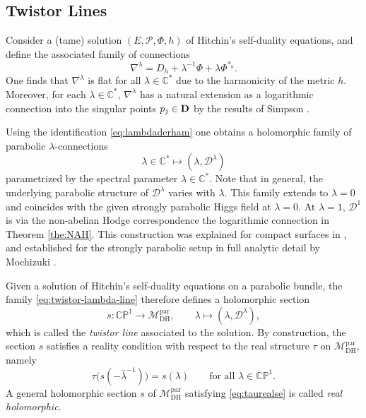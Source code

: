 \documentclass[12pt,a4paper]{amsart}
\theoremstyle{definition}
\theoremstyle{remark}
\newcommand{\C}{\mathbb C}
\newcommand{\CP}{\mathbb{CP}}
\newcommand{\Mcal}{\mathcal M}
\newcommand{\Pcal}{\mathcal P}
\newcommand{\Dcal}{\mathcal D}
\begin{document}
\subsection{Twistor Lines}
Consider a (tame) solution  $(E,\Pcal,\Phi,h)$ of Hitchin's self-duality equations, and define the
associated family of  connections
 \begin{equation}\label{eq:assocfam}
 \nabla^\lambda = D_h +\lambda^{-1} \Phi + \lambda\Phi^{*_h}.\end{equation}
 One finds that $ \nabla^\lambda$ is flat for all $\lambda\in\C^*$ due to the harmonicity of the metric $h$.
 Moreover, for each $\lambda\in\C^*$, $ \nabla^\lambda $ has a natural extension as 
 a logarithmic connection into the singular points $p_j\in{\bf D}$ by the results of Simpson \cite{Sim2}. 



 
 Using the identification \eqref{eq:lambdaderham}
 one obtains a holomorphic family of parabolic
$\lambda$-connections
\begin{equation}\label{eq:twistor-lambda-line}
\lambda\in\C^* \mapsto (\lambda,\mathcal D^\lambda)
\end{equation}
parametrized by the spectral parameter $\lambda\in\C^*.$
Note that in general, the underlying parabolic structure of $\Dcal^\lambda$ varies with $\lambda$.
This family extends to $\lambda=0$ and coincides with the given strongly parabolic Higgs field at $\lambda=0$. At $\lambda=1$,  $\mathcal D^1$ is via the non-abelian Hodge correspondence the logarithmic connection in Theorem \ref{the:NAH}.
This construction was explained for compact surfaces in \cite{Sim3}, and 
 established for the strongly parabolic setup in full analytic
detail by Mochizuki 
\cite{Mochizuki2006,Mo}.
 
Given
a solution of Hitchin's
self-duality equations on a parabolic bundle,
the
family \eqref{eq:twistor-lambda-line} therefore defines a holomorphic section
\[
s\colon \CP^1 \longrightarrow \Mcal_{\mathrm{DH}}^{\mathrm{par}},\qquad
\lambda \longmapsto(\lambda,\Dcal^\lambda),
\]
which is called the \emph{twistor line} associated to the solution.
By construction, the section $s$ satisfies a reality condition with respect to the
real structure $\tau$ on $\Mcal_{\mathrm{DH}}^{\mathrm{par}}$, namely
\begin{equation}\label{eq:taurealse}
\tau\bigl(s(-\bar{\lambda}^{-1})\bigr)=s(\lambda)
\qquad\text{for all }\lambda\in\CP^1.
\end{equation}
A general holomorphic section $s$  of
$\Mcal_{\mathrm{DH}}^{\mathrm{par}}$ satisfying \eqref{eq:taurealse} is called {\em real holomorphic}.
\end{document}
